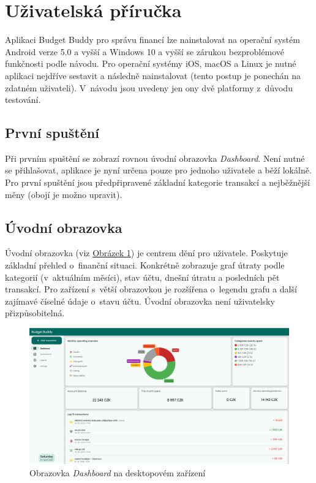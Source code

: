 \documentclass[
  biblatex,
  figures=true,
  tables=false,
  glossaries,
  index
]{kidiplom}
\begin{document}
\section{Uživatelská příručka}
Aplikaci Budget Buddy pro správu financí lze nainstalovat na operační systém Android verze 5.0 a vyšší a Windows 10 a vyšší se zárukou bezproblémové funkčnosti podle návodu. Pro operační systémy iOS, macOS a Linux je nutné aplikaci nejdříve sestavit a následně nainstalovat (tento postup je ponechán na zdatném uživateli). V~návodu jsou uvedeny jen ony dvě platformy z~důvodu testování. 

\subsection{První spuštění}
Při prvním spuštění se zobrazí rovnou úvodní obrazovka \textit{Dashboard}. Není nutné se přihlašovat, aplikace je nyní určena pouze pro jednoho uživatele a běží lokálně. Pro první spuštění jsou předpřipravené základní kategorie transakcí a nejběžnější měny (obojí je možno upravit). 

\subsection{Úvodní obrazovka}
Úvodní obrazovka (viz \hyperref[fig:dashboard-large]{Obrázek \ref{fig:dashboard-large}}) je centrem dění pro uživatele. Poskytuje základní přehled o~finanční situaci. Konkrétně zobrazuje graf útraty podle kategorií (v~aktuálním měsíci), stav účtu, dnešní útratu a posledních pět transakcí. Pro zařízení s~větší obrazovkou je rozšířena o~legendu grafu a další zajímavé číselné údaje o~stavu účtu. Úvodní obrazovka není uživatelsky přizpůsobitelná.

\begin{figure}
  \centering
  \includegraphics[width=\textwidth]{images/dashboard-large.png}
  \caption{Obrazovka \textit{Dashboard} na desktopovém zařízení}
  \label{fig:dashboard-large}
\end{figure}
\end{document}
